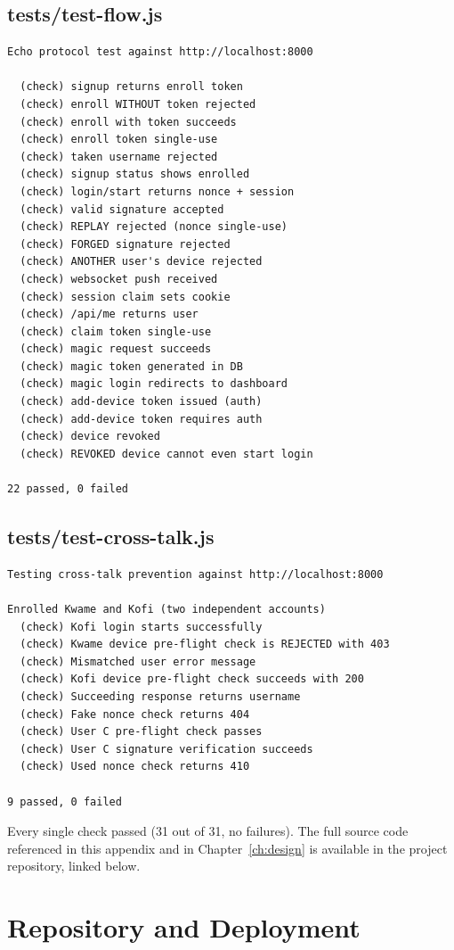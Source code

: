 \section*{tests/test-flow.js}
\begin{lstlisting}
Echo protocol test against http://localhost:8000

  (check) signup returns enroll token
  (check) enroll WITHOUT token rejected
  (check) enroll with token succeeds
  (check) enroll token single-use
  (check) taken username rejected
  (check) signup status shows enrolled
  (check) login/start returns nonce + session
  (check) valid signature accepted
  (check) REPLAY rejected (nonce single-use)
  (check) FORGED signature rejected
  (check) ANOTHER user's device rejected
  (check) websocket push received
  (check) session claim sets cookie
  (check) /api/me returns user
  (check) claim token single-use
  (check) magic request succeeds
  (check) magic token generated in DB
  (check) magic login redirects to dashboard
  (check) add-device token issued (auth)
  (check) add-device token requires auth
  (check) device revoked
  (check) REVOKED device cannot even start login

22 passed, 0 failed
\end{lstlisting}

\section*{tests/test-cross-talk.js}
\begin{lstlisting}
Testing cross-talk prevention against http://localhost:8000

Enrolled Kwame and Kofi (two independent accounts)
  (check) Kofi login starts successfully
  (check) Kwame device pre-flight check is REJECTED with 403
  (check) Mismatched user error message
  (check) Kofi device pre-flight check succeeds with 200
  (check) Succeeding response returns username
  (check) Fake nonce check returns 404
  (check) User C pre-flight check passes
  (check) User C signature verification succeeds
  (check) Used nonce check returns 410

9 passed, 0 failed
\end{lstlisting}

\noindent Every single check passed (31 out of 31, no failures). The full
source code referenced in this appendix and in Chapter~\ref{ch:design} is
available in the project repository, linked below.

\chapter{Repository and Deployment}
\label{app:repo}

